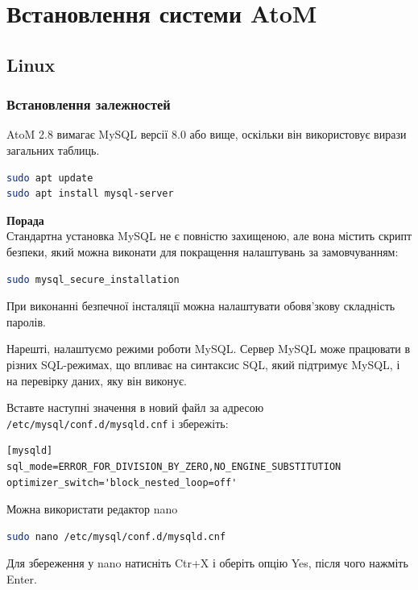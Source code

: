 \documentclass[14pt,a4paper]{article}
\begin{document}
\section{Встановлення системи AtoM}
\begin{large}

\subsection{Linux}

\subsubsection{Встановлення залежностей}
AtoM 2.8 вимагає MySQL версії 8.0 або вище, оскільки він використовує вирази загальних таблиць.
\begin{lstlisting}[language=bash]
sudo apt update
sudo apt install mysql-server
\end{lstlisting}

\textbf{Порада} \\
Стандартна установка MySQL не є повністю захищеною, але вона містить скрипт безпеки, який можна виконати для покращення налаштувань за замовчуванням:

\begin{lstlisting}[language=bash]
sudo mysql_secure_installation
\end{lstlisting}

При виконанні безпечної інсталяції можна налаштувати обовя'зкову складність паролів.


Нарешті, налаштуємо режими роботи MySQL. Сервер MySQL може працювати в різних SQL-режимах, що впливає на синтаксис SQL, який підтримує MySQL, і на перевірку даних, яку він виконує.


Вставте наступні значення в новий файл за адресою \texttt{/etc/mysql/conf.d/mysqld.cnf} і збережіть:

\begin{lstlisting}
[mysqld]
sql_mode=ERROR_FOR_DIVISION_BY_ZERO,NO_ENGINE_SUBSTITUTION
optimizer_switch='block_nested_loop=off'
\end{lstlisting}

Можна використати редактор nano

\begin{lstlisting}[language=bash]
sudo nano /etc/mysql/conf.d/mysqld.cnf
\end{lstlisting}

Для збереження у nano натисніть Ctr+X і оберіть опцію Yes, після чого нажміть Enter.


\end{large}
\end{document}
